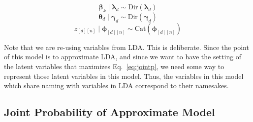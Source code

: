 \documentclass[12pt]{article}
\begin{document}
\begin{equation}\label{eq:betadirlambda}
    \bm{\beta}_{k} \mid \bm{\lambda}_{d} \sim \text{Dir}(\bm{\lambda}_{d})
\end{equation}
\begin{equation}\label{eq:thetadirgamma}
    \bm{\theta}_{d} \mid \bm{\gamma}_{d} \sim \text{Dir}(\bm{\gamma}_{d})
\end{equation}
\begin{equation}\label{eq:zcatphi}
    z_{[d][n]} \mid \bm{\phi}_{[d][n]} \sim \text{Cat}(\bm{\phi}_{[d][n]})
\end{equation}

\begin{center}
\end{center}

Note that we are re-using variables from LDA.  This is deliberate.  Since the
point of this model is to approximate LDA, and since we want to have the setting
of the latent variables that maximizes Eq.~\ref{eq:jointp}, we need some way to
represent those latent variables in this model.  Thus, the variables in this
model which share naming with variables in LDA correspond to their namesakes.

\subsection{Joint Probability of Approximate Model}
\end{document}
